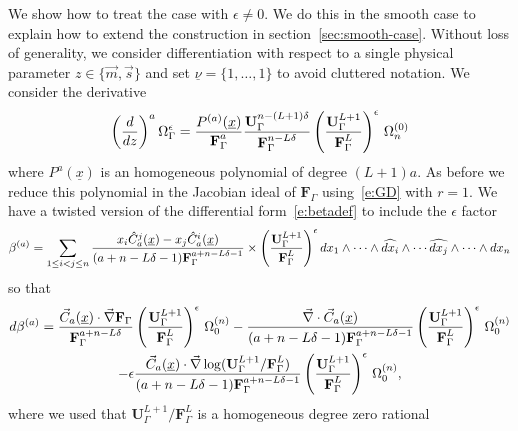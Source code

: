 \documentclass[a4paper,12pt]{article}
\numberwithin{equation}{section}
\numberwithin{figure}{section}
\begin{document}
We  show how to treat the  case with $\epsilon\neq0$. We do this in the smooth
case to explain how to extend the construction
in section~\ref{sec:smooth-case}. Without loss of generality,  we consider differentiation with respect to a single physical
parameter $z\in\{\vec m,\vec s\}$ and set $\underline
\nu=\{1,\dots,1\}$  to avoid cluttered notation.
We consider the derivative  
\begin{equation}
 \left(d\over dz\right)^a
 \Omega_\Gamma^\epsilon={P^{(a)}(\underline x)\over
   \textbf{F}_\Gamma^a} { \textbf{U}_\Gamma^{n-(L+1)\delta}\over
   \textbf{F}_\Gamma^{n-L\delta}} \left(\textbf{U}_\Gamma^{L+1}\over
   \textbf{F}_\Gamma^L \right)^\epsilon\,\Omega_n^{(0)}
   \label{derivativeOmega}
\end{equation}
where $P^a(\underline x)$ is an homogeneous polynomial of degree $(L+1)a$.
As before we reduce this polynomial in the Jacobian ideal of  $
\textbf{F}_\Gamma$ using~\eqref{e:GD} with $r=1$.
We have a twisted version  of the differential form~\eqref{e:betadef} to
include the $\epsilon$ factor
   \begin{equation}\label{e:betadefepsilon}
  \beta^{(a)}=   \sum_{1\leq i<j\leq n} {x_i
    \hat C_{a}^j  (\underline x)-x_j
    \hat C_{a}^i(\underline x)\over (a+n-L\delta-1)\textbf{F}_\Gamma^{a+n-L\delta-1}}\times \left(\textbf{U}_\Gamma^{L+1}\over
   \textbf{F}_\Gamma^L \right)^\epsilon
dx_1\wedge \cdots \wedge \widehat{dx_i}\wedge \cdots \widehat{dx_j}\wedge
  \cdots \wedge dx_n
   \end{equation}
  so that
   \begin{multline}
     d\beta^{(a)}= {    \vec C_{a}
     (\underline x)\cdot\vec\nabla
   \textbf{F}_\Gamma\over
     \textbf{F}_\Gamma^{a+n-L\delta}}\left(\textbf{U}_\Gamma^{L+1}\over
   \textbf{F}_\Gamma^L \right)^\epsilon\,\Omega_0^{(n)}- {
     \vec\nabla\cdot \vec C_{a}
     (\underline x)
    \over  (a+n-L\delta-1)  \textbf{F}_\Gamma^{a+n-L\delta-1}}\left(\textbf{U}_\Gamma^{L+1}\over
    \textbf{F}_\Gamma^L \right)^\epsilon\, \Omega_0^{(n)}\cr
  -\epsilon {
     \vec C_{a}
     (\underline x) \cdot\vec\nabla \log(\textbf{U}_\Gamma^{L+1}/
    \textbf{F}_\Gamma^L )
    \over  (a+n-L\delta-1)
    \textbf{F}_\Gamma^{a+n-L\delta-1}}\left(\textbf{U}_\Gamma^{L+1}\over 
    \textbf{F}_\Gamma^L \right)^\epsilon\, \Omega_0^{(n)} ,
   \end{multline}
where we used that $\textbf{U}_\Gamma^{L+1}/
   \textbf{F}_\Gamma^L$ is a homogeneous degree zero rational
\end{document}

